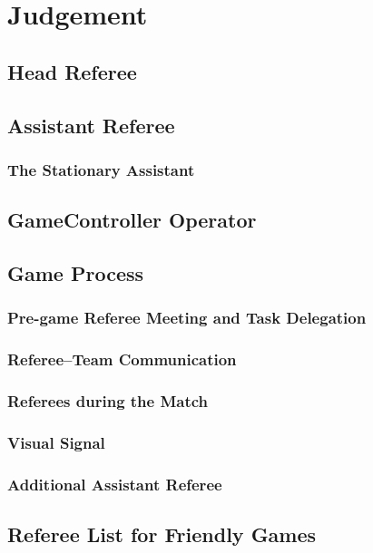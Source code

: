 \section{Judgement}
\label{sec:judgement}

\subsection{Head Referee}
\label{sec:head_referee}

\subsection{Assistant  Referee}
\label{sec:assistant_referee}

\subsubsection{The Stationary Assistant}

\subsection{GameController Operator}
\label{sec:gamecontroller_operator}

\subsection{Game Process}

\subsubsection{Pre-game Referee Meeting and Task Delegation}
\label{sec:referee_delegation}

\subsubsection{Referee--Team Communication}
\label{sec:referee_team_communication}

\subsubsection{Referees during the Match}
\label{sec:referee_during_match}

\subsubsection{Visual Signal}
\label{sec:referee_visual_signal}

\subsubsection{Additional Assistant Referee}
\label{sec:additional_assistant_referee}

\subsection{Referee List for Friendly Games}
\label{sec:referee_list}

